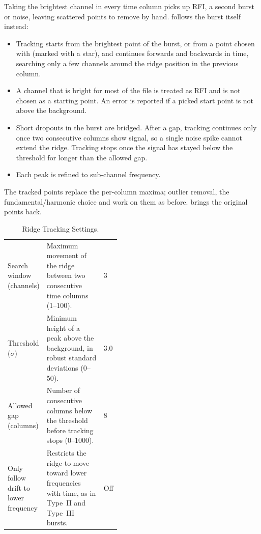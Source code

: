 Taking the brightest channel in every time column picks up RFI, a second burst or noise,
leaving scattered points to remove by hand.  follows the burst itself
instead:
\begin{itemize}
  \item Tracking starts from the brightest point of the burst, or from a point chosen with
     (marked with a star), and continues forwards and backwards in time,
    searching only a few channels around the ridge position in the previous column.
  \item A channel that is bright for most of the file is treated as RFI and is not chosen
    as a starting point. An error is reported if a picked start point is not above the
    background.
  \item Short dropouts in the burst are bridged. After a gap, tracking continues only once
    two consecutive columns show signal, so a single noise spike cannot extend the ridge.
    Tracking stops once the signal has stayed below the threshold for longer than the
    allowed gap.
  \item Each peak is refined to sub-channel frequency.
\end{itemize}
The tracked points replace the per-column maxima; outlier removal, the
fundamental/harmonic choice and  work on them as before.
 brings the original points back.

\begin{table}[!htbp]
  \centering
  \caption{Ridge Tracking Settings.}
  \label{tab:ridge-settings}
  \small
  \begin{tabularx}{\linewidth}{@{}P{0.3\linewidth}LP{0.14\linewidth}@{}}
    \toprule
     &  &  \\
    \midrule
    Search window (channels) & Maximum movement of the ridge between two consecutive time columns (1--100). & 3 \\
    Threshold (\(\sigma\)) & Minimum height of a peak above the background, in robust standard deviations (0--50). & 3.0 \\
    Allowed gap (columns) & Number of consecutive columns below the threshold before tracking stops (0--1000). & 8 \\
    Only follow drift to lower frequency & Restricts the ridge to move toward lower frequencies with time, as in Type~II and Type~III bursts. & Off \\
    \bottomrule
  \end{tabularx}
\end{table}

